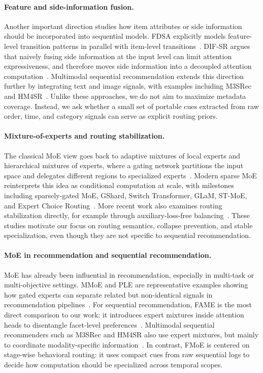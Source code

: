 \documentclass[sigconf,anonymous,review]{acmart}
\begin{document}
\paragraph{Feature and side-information fusion.}
Another important direction studies how item attributes or side information should be incorporated into sequential models. FDSA explicitly models feature-level transition patterns in parallel with item-level transitions~\cite{zhang2019fdsa}. DIF-SR argues that naively fusing side information at the input level can limit attention expressiveness, and therefore moves side information into a decoupled attention computation~\cite{xie2022difsr}. Multimodal sequential recommendation extends this direction further by integrating text and image signals, with examples including M3SRec and HM4SR~\cite{bian2023m3srec,zhang2025hm4sr}. Unlike these approaches, we do not aim to maximize metadata coverage. Instead, we ask whether a small set of portable cues extracted from raw order, time, and category signals can serve as explicit routing priors.

\paragraph{Mixture-of-experts and routing stabilization.}
The classical MoE view goes back to adaptive mixtures of local experts and hierarchical mixtures of experts, where a gating network partitions the input space and delegates different regions to specialized experts~\cite{jacobs1991adaptive,jordan1994hme}. Modern sparse MoE reinterprets this idea as conditional computation at scale, with milestones including sparsely-gated MoE, GShard, Switch Transformer, GLaM, ST-MoE, and Expert Choice Routing~\cite{shazeer2017moe,lepikhin2021gshard,fedus2022switch,du2022glam,zoph2022stmoe,zhou2022expertchoice}. More recent work also examines routing stabilization directly, for example through auxiliary-loss-free balancing~\cite{wang2024lossfree}. These studies motivate our focus on routing semantics, collapse prevention, and stable specialization, even though they are not specific to sequential recommendation.

\paragraph{MoE in recommendation and sequential recommendation.}
MoE has already been influential in recommendation, especially in multi-task or multi-objective settings. MMoE and PLE are representative examples showing how gated experts can separate related but non-identical signals in recommendation pipelines~\cite{ma2018mmoe,tang2020ple}. For sequential recommendation, FAME is the most direct comparison to our work: it introduces expert mixtures inside attention heads to disentangle facet-level preferences~\cite{liu2025fame}. Multimodal sequential recommenders such as M3SRec and HM4SR also use expert mixtures, but mainly to coordinate modality-specific information~\cite{bian2023m3srec,zhang2025hm4sr}. In contrast, FMoE is centered on stage-wise behavioral routing: it uses compact cues from raw sequential logs to decide how computation should be specialized across temporal scopes.
\end{document}
